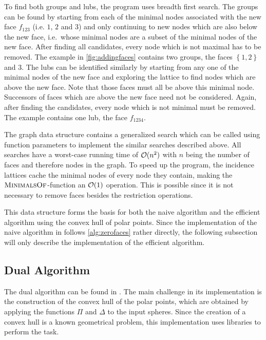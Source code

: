 To find both groups and lubs, the program uses breadth first search.
The groups can be found by starting from each of the minimal nodes associated with the new face $f_{123}$ (i.e. $1$, $2$ and $3$) and only continuing to new nodes which are also below the new face, i.e.~whose minimal nodes are a subset of the minimal nodes of the new face.
After finding all candidates, every node which is not maximal has to be removed.
The example in \cref{fig:addingfaces} contains two groups, the faces $\left\{ 1, 2 \right\}$ and $3$.
The lubs can be identified similarly by starting from any one of the minimal nodes of the new face and exploring the lattice to find nodes which are above the new face.
Note that those faces must all be above this minimal node.
Successors of faces which are above the new face need not be considered.
Again, after finding the candidates, every node which is not minimal must be removed.
The example contains one lub, the face $f_{1234}$.

The graph data structure contains a generalized search which can be called using function parameters to implement the similar searches described above.
All searches have a worst-case running time of $\mathcal{O}(n^2)$ with $n$ being the number of faces and therefore nodes in the graph.
To speed up the program, the incidence lattices cache the minimal nodes of every node they contain, making the $\textsc{MinimalsOf}$-function an $\mathcal{O}(1)$ operation.
This is possible since it is not necessary to remove faces besides the restriction operations.

This data structure forms the basis for both the naive algorithm and the efficient algorithm using the convex hull of polar points.
Since the implementation of the naive algorithm in  follows \cref{alg:zerofaces} rather directly, the following subsection will only describe the implementation of the efficient algorithm.

\subsection{Dual Algorithm}
\label{sub:impl_dual_algorithm}
The dual algorithm can be found in .
The main challenge in its implementation is the construction of the convex hull of the polar points, which are obtained by applying the functions $\Pi$ and $\Delta$ to the input spheres.
Since the creation of a convex hull is a known geometrical problem, this implementation uses libraries to perform the task.

